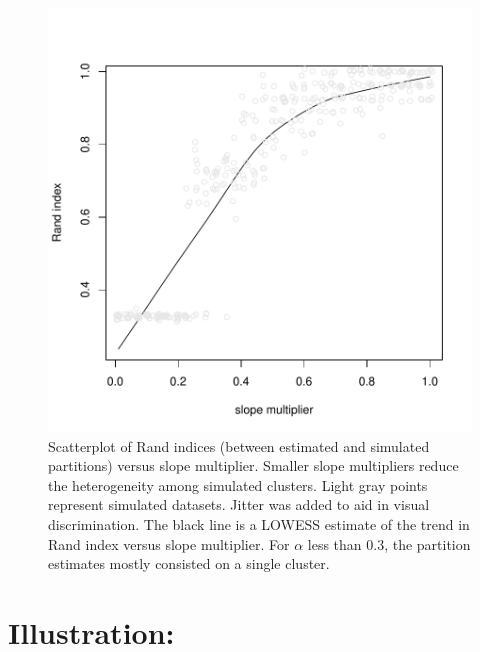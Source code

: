 \documentclass[article, nojss]{jss}
\begin{document}
\begin{figure}[h!]
\begin{center}
\includegraphics{profdpm-007}
\end{center}
\caption{Scatterplot of Rand indices (between estimated and simulated partitions) versus slope multiplier. Smaller slope multipliers reduce the heterogeneity among simulated clusters. Light gray points represent simulated datasets. Jitter was added to aid in visual discrimination. The black line is a LOWESS estimate of the trend in Rand index versus slope multiplier. For $\alpha$ less than 0.3, the partition estimates mostly consisted on a single cluster. \label{fig:sim2}}
\end{figure}

\vspace{1cm}
\section[Illustrations]{Illustration: } \label{Examples:profBinary}
\end{document}
